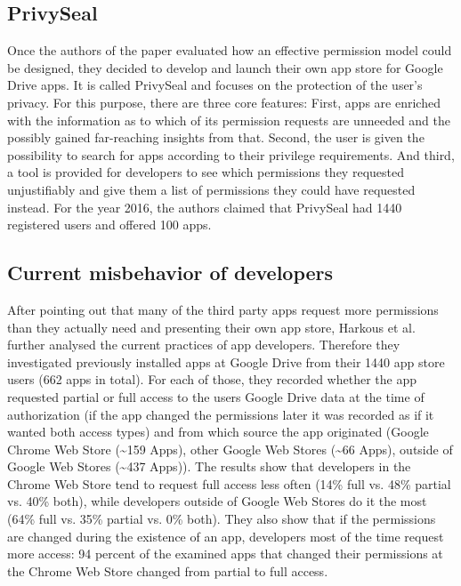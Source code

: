 \documentclass[11pt,twocolumn,a4paper,DIV=calc]{scrartcl}
\begin{document}
\subsection{PrivySeal} 

Once the authors of the paper evaluated how an effective permission model could be designed, they decided to develop and launch their own app store for Google Drive apps. 
It is called PrivySeal and focuses on the protection of the user's privacy. 
For this purpose, there are three core features: First, apps are enriched with the information as to which of its permission requests are unneeded and the possibly gained far-reaching insights from that. 
Second, the user is given the possibility to search for apps according to their privilege requirements. 
And third, a tool is provided for developers to see which permissions they requested unjustifiably and give them a list of permissions they could have requested instead. 
For the year 2016, the authors claimed that PrivySeal had 1440 registered users and offered 100 apps. 

\subsection{Current misbehavior of developers}

After pointing out that many of the third party apps request more permissions than they actually need and presenting their own app store, Harkous et al. further analysed the current practices of app developers. 
Therefore they investigated previously installed apps at Google Drive from their 1440 app store users (662 apps in total). 
For each of those, they recorded whether the app requested partial or full access to the users Google Drive data at the time of authorization (if the app changed the permissions later it was recorded as if it wanted both access types) and from which source the app originated (Google Chrome Web Store (\textasciitilde 159 Apps), other Google Web Stores (\textasciitilde 66 Apps), outside of Google Web Stores (\textasciitilde 437 Apps)). 
The results show that developers in the Chrome Web Store tend to request full access less often (14\% full vs. 48\% partial vs. 40\% both), while developers outside of Google Web Stores do it the most (64\% full vs. 35\% partial vs. 0\% both). 
They also show that if the permissions are changed during the existence of an app, developers most of the time request more access: 94 percent of the examined apps that changed their permissions at the Chrome Web Store changed from partial to full access. \\ 
\end{document}
